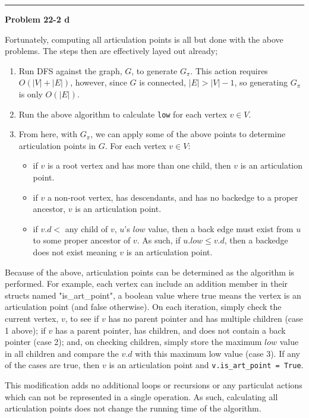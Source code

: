\documentclass{article}
\newcommand\separator{\rule{\textwidth}{.2pt}}  %
\begin{document}
\separator

\textbf{Problem 22-2 d} 

Fortunately, computing all articulation points is all but done with the above 
problems. The steps then are effectively layed out already;

\begin{enumerate}
    \item Run DFS against the graph, $G$, to generate $G_\pi$. This action 
        requires $O(|V|+|E|)$, however, since $G$ is connected, $|E| > |V| - 1$,
        so generating $G_\pi$ is only $O(|E|)$. 
    \item Run the above algorithm to calculate \texttt{low} for each vertex $v 
        \in V$.
    \item From here, with $G_\pi$, we can apply some of the above points to 
        determine articulation points in $G$. For each vertex $v \in V$:
    \begin{itemize}
        \item if $v$ is a root vertex and has more than one child, then $v$ is 
            an articulation point.
        \item if $v$ a non-root vertex, has descendants, and has no backedge to 
            a proper ancestor, $v$ is an articulation point. 
        \item if $v.d < $ any child of $v$, $u$'s $low$ value, then a back edge 
            must exist from $u$ to some proper ancestor of $v$. As such, if 
            $u.low \le v.d$, then a backedge does not exist meaning $v$ is an 
            articulation point. 
    \end{itemize}
\end{enumerate}

Because of the above, articulation points can be determined as the algorithm is 
performed. For example, each vertex can include an addition member in their 
structs named "is\_art\_point", a boolean value where true means the vertex is 
an articulation point (and false otherwise). On each iteration, simply check 
the current vertex, $v$, to see if $v$ has no parent pointer and has multiple 
children (case 1 above); if $v$ has a parent pointer, has children, and does not
contain a back pointer (case 2); and, on checking children, simply store the 
maximum $low$ value in all children and compare the $v.d$ with this maximum low 
value (case 3). If any of the cases are true, then $v$ is an articulation point 
and \texttt{v.is\_art\_point = True}. 

This modification adds no additional loops or recursions or any particulat 
actions which can not be represented in a single operation. As such, calculating
all articulation points does not change the running time of the algorithm. 
\end{document}
